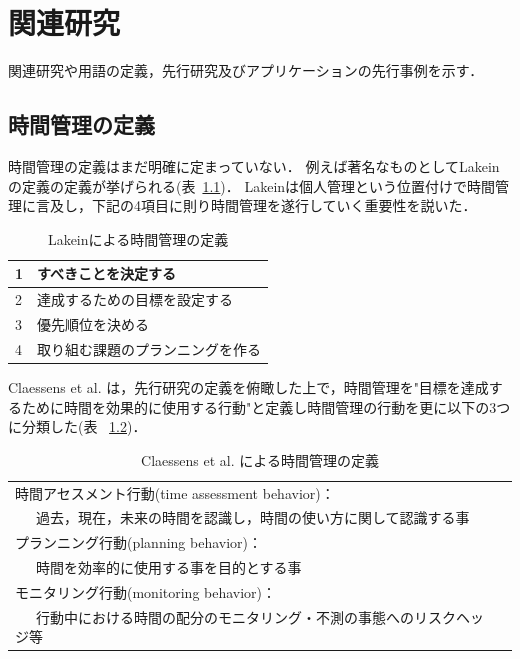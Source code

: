 \chapter{関連研究}
関連研究や用語の定義，先行研究及びアプリケーションの先行事例を示す．

\section{時間管理の定義}
時間管理の定義はまだ明確に定まっていない．
例えば著名なものとしてLakeinの定義\cite{Lakein1989}の定義が挙げられる(表~\ref{tb:Lakein})．
Lakeinは個人管理という位置付けで時間管理に言及し，下記の4項目に則り時間管理を遂行していく重要性を説いた．

\begin{table}[htb]
\begin{center}
  \begin{tabular}{|l|l|} \hline
   1 & すべきことを決定する \\ \hline
   2 & 達成するための目標を設定する \\ \hline
   3 & 優先順位を決める \\ \hline
   4 & 取り組む課題のプランニングを作る \\ \hline
  \end{tabular}
  \caption{Lakeinによる時間管理の定義}
  \label{tb:Lakein}
\end{center}
\end{table}

Claessens et al. は，先行研究の定義を俯瞰した上で，時間管理を"目標を達成するために時間を効果的に使用する行動"と定義し時間管理の行動を更に以下の3つに分類した\cite{Claessens2007}(表 ~\ref{tb:Claessens})．

\begin{table}[htb]
\begin{center}
  \begin{tabular}{|l|l|} \hline
   時間アセスメント行動(time assessment behavior)： \\ ~~~過去，現在，未来の時間を認識し，時間の使い方に関して認識する事 \\ \hline
   プランニング行動(planning behavior)：　\\  ~~~時間を効率的に使用する事を目的とする事 \\ \hline
   モニタリング行動(monitoring behavior)： \\ ~~~行動中における時間の配分のモニタリング・不測の事態へのリスクヘッジ等 \\ \hline
  \end{tabular}
  \caption{Claessens et al. による時間管理の定義}
  \label{tb:Claessens}
\end{center}
\end{table}

